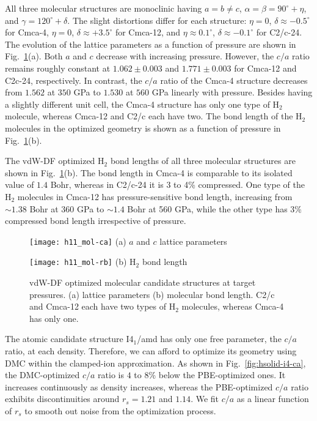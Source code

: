 All three molecular structures are monoclinic having $a=b\neq c$, $\alpha=\beta=90^\circ+\eta$, and $\gamma=120^\circ+\delta$. The slight distortions differ for each structure: $\eta=0$, $\delta\approx -0.5^\circ$ for Cmca-4, $\eta=0$, $\delta\approx+3.5^\circ$ for Cmca-12, and $\eta\approx0.1^\circ$, $\delta\approx-0.1^\circ$ for C2/c-24.
The evolution of the lattice parameters as a function of pressure are shown in Fig.~\ref{fig:hsolid-vdw-ca}(a).
Both $a$ and $c$ decrease with increasing pressure.
However, the $c/a$ ratio remains roughly constant at $1.062\pm0.003$ and $1.771\pm0.003$ for Cmca-12 and C2c-24, respectively.
In contrast, the $c/a$ ratio of the Cmca-4 structure decreases from $1.562$ at $350$ GPa to $1.530$ at $560$ GPa linearly with pressure.
Besides having a slightly different unit cell, the Cmca-4 structure has only one type of H$_2$ molecule, whereas Cmca-12 and C2/c each have two.
The bond length of the H$_2$ molecules in the optimized geometry is shown as a function of pressure in Fig.~\ref{fig:hsolid-vdw-ca}(b).

The vdW-DF optimized H$_2$ bond lengths of all three molecular structures are shown in Fig.~\ref{fig:hsolid-vdw-ca}(b).
The bond length in Cmca-4 is comparable to its isolated value of $1.4$ Bohr, whereas in C2/c-24 it is 3 to 4\% compressed.
One type of the H$_2$ molecules in Cmca-12 has pressure-sensitive bond length, increasing from $\sim 1.38$ Bohr at 360 GPa to $\sim 1.4$ Bohr at 560 GPa, while the other type has 3\% compressed bond length irrespective of pressure.

\begin{figure}[h]
	\centering
	\begin{minipage}{0.49\textwidth}
		\centering
		\texttt{[image: h11\_mol-ca]}
		(a) $a$ and $c$ lattice parameters
	\end{minipage}
	\begin{minipage}{0.49\textwidth}
		\centering
		\texttt{[image: h11\_mol-rb]}
		(b) H$_2$ bond length
	\end{minipage}
	\caption{vdW-DF optimized molecular candidate structures at target pressures. (a) lattice parameters (b) molecular bond length. C2/c and Cmca-12 each have two types of H$_2$ molecules, whereas Cmca-4 has only one.}
	\label{fig:hsolid-vdw-ca}
\end{figure}

The atomic candidate structure I4$_1$/amd has only one free parameter, the $c/a$ ratio, at each density.
Therefore, we can afford to optimize its geometry using DMC within the clamped-ion approximation.
As shown in Fig.~\ref{fig:hsolid-i4-ca}, the DMC-optimized $c/a$ ratio is $4$ to $8$\% below the PBE-optimized ones.
It increases continuously as density increases, whereas the PBE-optimized $c/a$ ratio exhibits discontinuities around $r_s=1.21$ and $1.14$.
We fit $c/a$ as a linear function of $r_s$ to smooth out noise from the optimization process.

